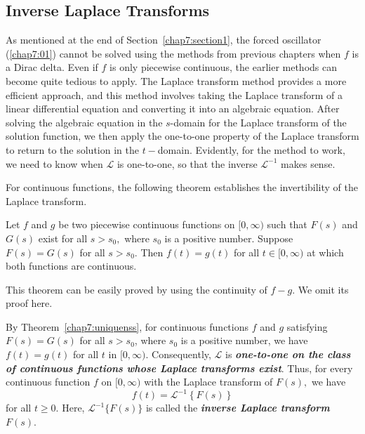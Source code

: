  \subsection{Inverse Laplace Transforms}\label{chap7:subsection1}

 As mentioned at the end of Section~\ref{chap7:section1}, the forced oscillator (\ref{chap7:01}) cannot be solved using the methods from previous chapters when \( f \) is a Dirac delta. Even if \( f \) is only piecewise continuous, the earlier methods can become quite tedious to apply. The Laplace transform method provides a more efficient approach, and this method involves taking the Laplace transform of a linear differential equation and converting it into an algebraic equation. After solving the algebraic equation in the $s$-domain for the Laplace transform of the solution function, we then apply the one-to-one property of the Laplace transform to return to the solution in the $t-$domain. Evidently, for the method to work, we need to know when \(\mathscr{L}\) is one-to-one, so that the inverse $\mathscr{L}^{-1}$ makes sense.


For continuous functions, the following theorem establishes the invertibility of the Laplace transform. 
\begin{theorem}\label{chap7:uniquenss}
Let $f$ and $g$ be two piecewise continuous functions on \([0, \infty)\) such that $F(s)$ and $G(s)$ exist for all $s>s_0,$ where $s_0$ is a positive number. 
Suppose $F(s) = G(s)$ for all $s>s_0.$
Then $f(t) = g(t)$ for all \(t\in [0,\infty)\) at which both  functions are continuous. 
\end{theorem}
This theorem can be easily proved by using the continuity of \( f - g \). We omit its proof here.

By Theorem~\ref{chap7:uniquenss}, for continuous functions $f$ and $g$ satisfying $F(s) = G(s)$  for all $s>s_0$, where $s_0$ is a positive number,  we have $f(t) = g(t)$ for all $t$ in $[0, \infty).$ Consequently, $\mathscr{L}$ is\textbf{\textit{ one-to-one on the class of continuous functions whose Laplace transforms exist}}.
Thus, for every continuous function $f$ on $[0, \infty)$ with the Laplace transform of $F(s),$
we have \[f(t) =\mathscr{L}^{-1}\left\{F(s)\right\}\] for all $t\ge 0.$  Here, $\mathscr{L}^{-1}\{F(s)\}$ is called  the \textbf{\textit{inverse  Laplace transform}} $F(s).$ 



